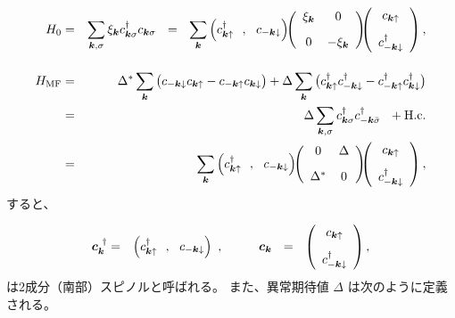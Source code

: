 \documentclass[uplatex,a4j,12pt,dvipdfmx]{jsarticle}
\begin{document}
\begin{eqnarray}
	H_{0}
	&=&
	\sum_{\bm{k},\sigma}
	\xi_{\bm{k}}
	c^{\dagger}_{\bm{k} \sigma}
	c_{\bm{k} \sigma}
	\ \ = \ \
	\sum_{\bm{k}}
	\left(
	c_{\bm{k} \uparrow}^{\dagger} \ \ , \ \
	c_{-\bm{k} \downarrow}
	\right)
	\!\!
	\left(
	\begin{array}{cc}
			\xi_{\bm{k}} & 0
			\\[3mm]
			0             & -\xi_{\bm{k}}
		\end{array}
	\right)
	\!\!\!
	\left(
	\begin{array}{c}
			c_{\bm{k} \uparrow} \\[3mm]
			c_{-\bm{k} \downarrow}^{\dagger}
		\end{array}
	\right)
	,
	\\[4mm]
	H_{\rm MF}
	&=&
	\Delta^{*}
	\sum_{\bm{k}}
	\big(
	c_{-\bm{k} \downarrow}
	c_{\bm{k} \uparrow}
	-
	c_{-\bm{k} \uparrow}
	c_{\bm{k} \downarrow}
	\big)
	+
	\Delta
	\sum_{\bm{k}}
	\big(
	c^{\dagger}_{\bm{k} \uparrow}
	c^{\dagger}_{-\bm{k} \downarrow}
	-
	c^{\dagger}_{-\bm{k} \uparrow}
	c^{\dagger}_{\bm{k} \downarrow}
	\big)
	\\ &=&
	\Delta
	\sum_{\bm{k}, \sigma}
	c^{\dagger}_{\bm{k} \sigma}
	c^{\dagger}_{-\bm{k} \bar{\sigma}}
	\ \ +
	{\rm H.c.}
	\\ &=&
	\sum_{\bm{k}}
	\left(
	c_{\bm{k} \uparrow}^{\dagger} \ \ , \ \
	c_{-\bm{k} \downarrow}
	\right)
	\!\!
	\left(
	\begin{array}{cc}
			0          & \Delta \\[3mm]
			\Delta^{*} & 0
		\end{array}
	\right)
	\!\!\!
	\left(
	\begin{array}{c}
			c_{\bm{k} \uparrow} \\[3mm]
			c_{-\bm{k} \downarrow}^{\dagger}
		\end{array}
	\right)
	,
\end{eqnarray}
%
すると、

\begin{eqnarray}
	\bm{c}^{\ \dagger}_{\bm{k}}
	&=&
	\left(
	c_{\bm{k} \uparrow}^{\dagger} \ \ , \ \
	c_{-\bm{k} \downarrow}
	\right)
	\ , \hspace{10mm}
	\bm{c}_{\bm{k}}
	\ \ = \ \
	\left(
	\begin{array}{c}
			c_{\bm{k} \uparrow} \\[3mm]
			c_{-\bm{k} \downarrow}^{\dagger}
		\end{array}
	\right)
	,
\end{eqnarray}
%
は2成分（南部）スピノルと呼ばれる。
また、異常期待値 $\Delta$ は次のように定義される。
\end{document}

